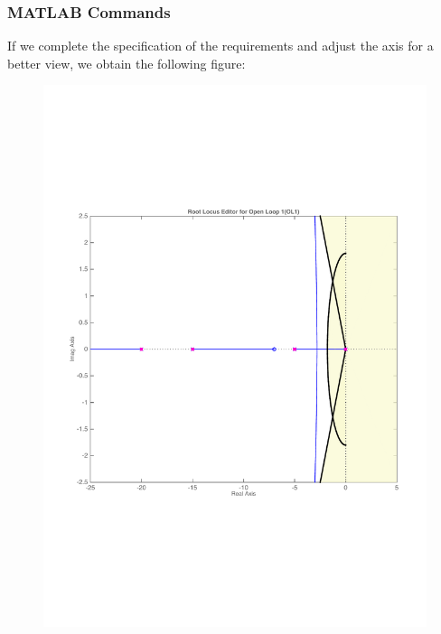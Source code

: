 \begin{frame}
\frametitle{MATLAB Commands}
	\begin{exampleblock}{}
		\justify
		If we complete the specification of the requirements and adjust the axis for a better view, we obtain the following figure:
		\begin{figure}
			\centering
			\includegraphics[width=0.5\linewidth]{matlab_ex6}
		\end{figure}
	\end{exampleblock}
\end{frame}
